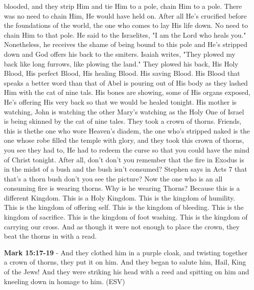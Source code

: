 \documentclass[11pt]{article}
\begin{document}
\begin{description}
blooded, and they strip Him
and tie Him to a pole, chain Him to a
pole. There was no need to chain Him, He
would have held on. After all He's crucified before the
foundations of the world, the one who
comes to lay His life down. No need to
chain Him to that pole. He said to the
Israelites, "I am the Lord who heals
you." Nonetheless, he receives the shame of
being bound to this pole and He's
stripped down and God offers his back to
the smiters. Isaiah writes,
"They plowed my back like long furrows,
like plowing the land." They plowed his
back, His Holy
Blood, His perfect
Blood, His healing Blood.
His saving
Blood. His Blood that speaks a better
word than that of Abel is pouring out of His body as they
lashed Him with the cat of nine
tals. His bones are showing, some of His organs exposed, He's
offering His very back so that we would
be healed tonight.
His mother is watching, John is
watching the other Mary's watching as the Holy One of
Israel is being skinned by the cat of nine tales.
They took a crown of thorns. Friends, this is thethe
one who wore Heaven's diadem, the one who's
stripped naked is the one whose robe filled the
temple with glory, and they took this crown of thorns,
you see they had to, He had to redeem the
curse so that you could have the mind of
Christ tonight. After all, don't don't you
remember that the fire in
Exodus is in the midst of a bush and the
bush isn't consumed? Stephen says in Acts 7 that
that's a thorn bush don't you see the picture? Now the
one who is an all consuming fire is
wearing thorns. Why is he wearing Thorns? Because
this is a different Kingdom.
This is a Holy Kingdom. This is the kingdom of
humility. This is the kingdom of offering
self. This is the kingdom of
bleeding. This is the kingdom of
sacrifice. This is the kingdom of foot
washing. This is the kingdom of carrying
our cross. And as though it were not
enough to place the crown, they beat the
thorns in with a read.

\textbf{Mark 15:17-19} - And they clothed him in a purple cloak, and twisting together a crown of thorns, they put it on him. And they began to salute him, Hail, King of the Jews! And they were striking his head with a reed and spitting on him and kneeling down in homage to him. (ESV)


\end{description}
\end{document}
